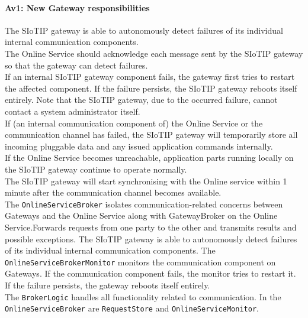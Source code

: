         \paragraph{Av1: New Gateway responsibilities}
            The SIoTIP gateway is able to autonomously detect failures of its individual internal communication components.\\
            The Online Service should acknowledge each message sent by the SIoTIP gateway so that the gateway can detect failures.\\
            If an internal SIoTIP gateway component fails, the gateway first tries to restart the affected component.
            If the failure persists, the SIoTIP gateway reboots itself entirely. Note that the SIoTIP gateway,
            due to the occurred failure, cannot contact a system administrator itself.\\
            If (an internal communication component of) the Online Service or the communication
            channel has failed, the SIoTIP gateway will temporarily store all incoming pluggable data
            and any issued application commands internally.\\
            If the Online Service becomes unreachable, application parts running locally on the SIoTIP
            gateway continue to operate normally.\\
            The SIoTIP gateway will start synchronising with the Online service within 1 minute after the
            communication channel becomes available.\\

            The \texttt{OnlineServiceBroker} isolates communication-related concerns between Gateways and the Online Service
            along with GatewayBroker on the Online Service.Forwards requests from one party to the other and transmits results and
            possible exceptions.
            The SIoTIP gateway is able to autonomously detect failures of its individual internal communication components.
            The  \texttt{OnlineServiceBrokerMonitor} monitors the communication component on Gateways.
            If the communication component fails, the monitor tries to restart it. If the failure persists,
            the gateway reboots itself entirely.\\
            The \texttt{BrokerLogic} handles all functionality related to communication. In the \texttt{OnlineServiceBroker}
            are \texttt{RequestStore} and \texttt{OnlineServiceMonitor}.


